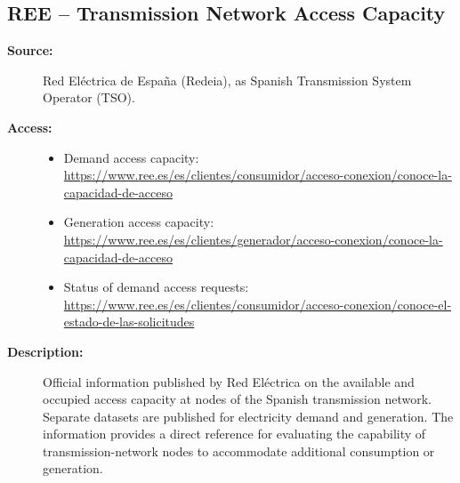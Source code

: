 
\subsection{REE -- Transmission Network Access Capacity}

\begin{description}

    \item[\textbf{Source:}]
    Red Eléctrica de España (Redeia), as Spanish Transmission System
    Operator (TSO).

    \item[\textbf{Access:}] \hfill
    \begin{itemize}

        \item Demand access capacity:
        \url{https://www.ree.es/es/clientes/consumidor/acceso-conexion/conoce-la-capacidad-de-acceso}

        \item Generation access capacity:
        \url{https://www.ree.es/es/clientes/generador/acceso-conexion/conoce-la-capacidad-de-acceso}

        \item Status of demand access requests:
        \url{https://www.ree.es/es/clientes/consumidor/acceso-conexion/conoce-el-estado-de-las-solicitudes}

    \end{itemize}

    \item[\textbf{Description:}]
    Official information published by Red Eléctrica on the available and
    occupied access capacity at nodes of the Spanish transmission network.
    Separate datasets are published for electricity demand and generation.
    The information provides a direct reference for evaluating the capability
    of transmission-network nodes to accommodate additional consumption or
    generation.


\end{description}
